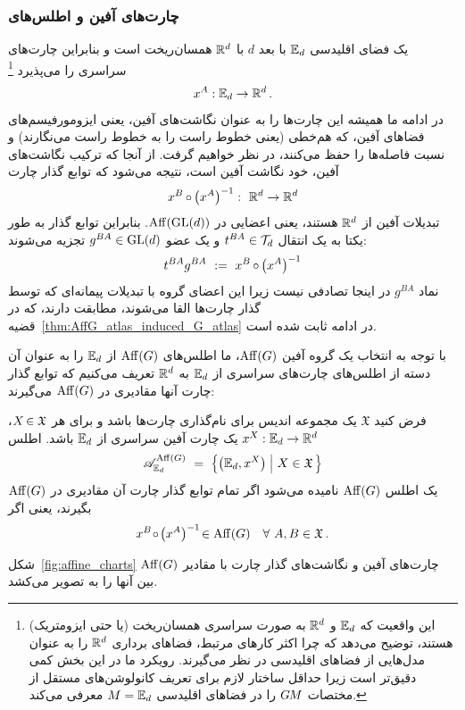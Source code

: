 \subsubsection{چارت‌های آفین و اطلس‌های }
یک فضای اقلیدسی $\mathbb{E}_d$ با بعد $d$ با $\mathbb{R}^d$ همسان‌ریخت است و بنابراین چارت‌های سراسری را می‌پذیرد%
\footnote{
	این واقعیت که $\mathbb{E}_d$ و $\mathbb{R}^d$ به صورت سراسری همسان‌ریخت (یا حتی ایزومتریک) هستند، توضیح می‌دهد که چرا اکثر کارهای مرتبط، فضاهای برداری $\mathbb{R}^d$ را به عنوان مدل‌هایی از فضاهای اقلیدسی در نظر می‌گیرند.
	رویکرد ما در این بخش کمی دقیق‌تر است زیرا حداقل ساختار لازم برای تعریف کانولوشن‌های مستقل از مختصات $G\mkern-1.4muM$ را در فضاهای اقلیدسی $M=\mathbb{E}_d$ معرفی می‌کند.
}
\begin{align}
	x^A: \mathbb{E}_d \to \mathbb{R}^d \,.
\end{align}
در ادامه ما همیشه این چارت‌ها را به عنوان نگاشت‌های آفین، یعنی ایزومورفیسم‌های فضاهای آفین، که هم‌خطی (یعنی خطوط راست را به خطوط راست می‌نگارند) و نسبت فاصله‌ها را حفظ می‌کنند، در نظر خواهیم گرفت.
از آنجا که ترکیب نگاشت‌های آفین، خود نگاشت آفین است، نتیجه می‌شود که توابع گذار چارت
\begin{align}
	x^B \mkern-1mu\circ\mkern-1mu \big(x^A \big)^{-1}:\ \mathbb{R}^d \to \mathbb{R}^d
\end{align}
تبدیلات آفین از $\mathbb{R}^d$ هستند، یعنی اعضایی در $\operatorname{Aff}(\operatorname{GL}(d))$.
بنابراین توابع گذار به طور یکتا به یک انتقال $t^{BA} \in \mathcal{T}_d$ و یک عضو $g^{BA} \in \operatorname{GL}(d)$ تجزیه می‌شوند:
\begin{align}
	t^{BA} g^{BA}\ :=\ x^B \mkern-1mu\circ\mkern-1mu \big(x^A \big)^{-1}
\end{align}
نماد $g^{BA}$ در اینجا تصادفی نیست زیرا این اعضای گروه با تبدیلات پیمانه‌ای که توسط گذار چارت‌ها القا می‌شوند، مطابقت دارند، که در قضیه~\ref{thm:AffG_atlas_induced_G_atlas} در ادامه ثابت شده است.

با توجه به انتخاب یک گروه آفین $\operatorname{Aff}(G)$، ما اطلس‌های $\operatorname{Aff}(G)$ از $\mathbb{E}_d$ را به عنوان آن دسته از اطلس‌های چارت‌های سراسری از $\mathbb{E}_d$ به $\mathbb{R}^d$ تعریف می‌کنیم که توابع گذار چارت آنها مقادیری در $\operatorname{Aff}(G)$ می‌گیرند:
\begin{dfn}
	\label{dfn:AffG_atlas}
	فرض کنید $\mathfrak{X}$ یک مجموعه اندیس برای نام‌گذاری چارت‌ها باشد و برای هر ${X \mkern-2mu\in \mathfrak{X}}$، $x^X: \mathbb{E}_d \to \mathbb{R}^d$ یک چارت آفین سراسری از $\mathbb{E}_d$ باشد.
	اطلس
	\begin{align}
		\mathscr{A}^{\Aff(G)}_{\Euc_d}\ =\ \pig\{ \big( \Euc_d, x^X \big) \;\pig|\ X\in \mathfrak{X} \,\pig\}
	\end{align}
	یک اطلس $\operatorname{Aff}(G)$ نامیده می‌شود اگر تمام توابع گذار چارت آن مقادیری در $\operatorname{Aff}(G)$ بگیرند، یعنی اگر
	\begin{align}
		x^B \mkern-3mu\circ\mkern-2mu \big(x^A\big)^{-1} \!\in \operatorname{Aff}(G) \quad \forall\ A,B \in \mathfrak{X} \,.
	\end{align}
\end{dfn}
شکل~\ref{fig:affine_charts} چارت‌های آفین و نگاشت‌های گذار چارت با مقادیر $\operatorname{Aff}(G)$ بین آنها را به تصویر می‌کشد.


